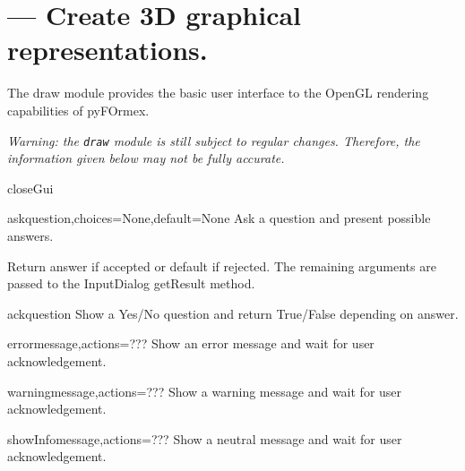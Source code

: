 
\section{ --- Create 3D graphical representations.}
\label{sec:draw}


The draw module provides the basic user interface to the OpenGL
rendering capabilities of pyFOrmex.

\emph{Warning: the \texttt{draw} module is still subject to regular changes.
Therefore, the information given below may not be fully accurate.
}



\begin{funcdesc}{closeGui}{}


\end{funcdesc}


\begin{funcdesc}{ask}{question,choices=None,default=None}
Ask a question and present possible answers.

    Return answer if accepted or default if rejected.
    The remaining arguments are passed to the InputDialog getResult method.
    

\end{funcdesc}


\begin{funcdesc}{ack}{question}
Show a Yes/No question and return True/False depending on answer.

\end{funcdesc}


\begin{funcdesc}{error}{message,actions=???}
Show an error message and wait for user acknowledgement.

\end{funcdesc}


\begin{funcdesc}{warning}{message,actions=???}
Show a warning message and wait for user acknowledgement.

\end{funcdesc}


\begin{funcdesc}{showInfo}{message,actions=???}
Show a neutral message and wait for user acknowledgement.

\end{funcdesc}


